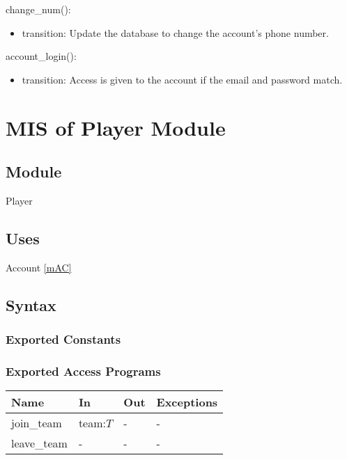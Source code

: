 \documentclass[12pt, titlepage]{article}
\begin{document}
\noindent change\_num():
\begin{itemize}
\item transition: Update the database to change the account's phone number.
\end{itemize}

\noindent account\_login():
\begin{itemize}
\item transition: Access is given to the account if the email and password match.
\end{itemize}

\newpage

\section{MIS of Player Module} \label{mPL}



\subsection{Module}

Player

\subsection{Uses}

Account \ref{mAC}

\subsection{Syntax}

\subsubsection{Exported Constants}

\subsubsection{Exported Access Programs}

\begin{center}
\begin{tabular}{p{2cm} p{4cm} p{4cm} p{2cm}}
\hline
\textbf{Name} & \textbf{In} & \textbf{Out} & \textbf{Exceptions} \\
\hline
join\_team & team:$T$ & - & - \\
leave\_team & - & - & - \\
\hline
\end{tabular}
\end{center}
\end{document}
